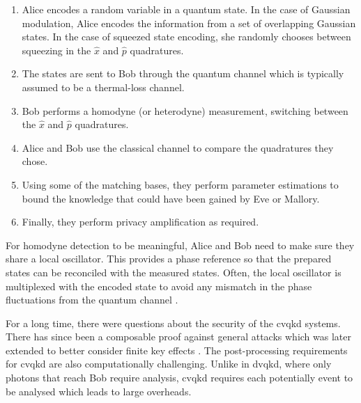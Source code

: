 \begin{algorithm}
\begin{enumerate}
	\item Alice encodes a random variable in a quantum state. In the case of Gaussian modulation, Alice encodes the information from a set of overlapping Gaussian states. In the case of squeezed state encoding, she randomly chooses between squeezing in the $\hat{x}$ and $\hat{p}$ quadratures.
	\item The states are sent to Bob through the quantum channel which is typically assumed to be a thermal-loss channel.
	\item Bob performs a homodyne (or heterodyne) measurement, switching between the $\hat{x}$ and $\hat{p}$ quadratures.
	\item Alice and Bob use the classical channel to compare the quadratures they chose.
	\item Using some of the matching bases, they perform parameter estimations to bound the knowledge that could have been gained by Eve or Mallory.
	\item Finally, they perform privacy amplification as required.
\end{enumerate}
\end{algorithm}





For homodyne detection to be meaningful, Alice and Bob need to make sure they share a local oscillator. This provides a phase reference so that the prepared states can be reconciled with the measured states. Often, the local oscillator is multiplexed with the encoded state to avoid any mismatch in the phase fluctuations from the quantum channel \cite{jouguet2013experimental}.

For a long time, there were questions about the security of the \ac{cvqkd} systems. There has since been a composable proof against general attacks \cite{Leverrier2015Composable} which was later extended to better consider finite key effects \cite{Leverrier2017Secrity}. The post-processing requirements for \ac{cvqkd} are also computationally challenging. Unlike in \ac{dvqkd}, where only photons that reach Bob require analysis, \ac{cvqkd} requires each potentially event to be analysed which leads to large overheads.

